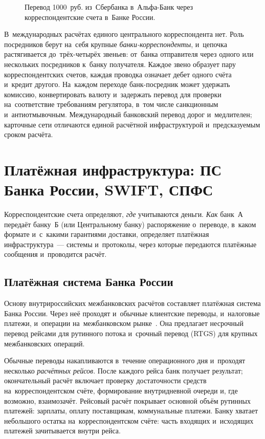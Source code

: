 \begin{figure}[tbp]
  \centering
  \caption{Перевод 1000~руб. из~Сбербанка в~Альфа-Банк через корреспондентские счета в~Банке России.}%
  \label{fig:correspondent-settlement}
\end{figure}

В~международных расчётах единого центрального корреспондента нет. Роль
посредников берут на~себя крупные \textit{банки-корреспонденты}, и~цепочка
растягивается до~трёх-четырёх звеньев: от~банка отправителя через одного или
нескольких посредников к~банку получателя. Каждое звено образует пару
корреспондентских счетов, каждая проводка означает дебет одного счёта и~кредит
другого. На~каждом переходе банк-посредник может удержать комиссию,
конвертировать валюту и~задержать перевод для проверки на~соответствие
требованиям регулятора, в~том числе санкционным и~антиотмывочным. Международный банковский перевод дорог и~медлителен;
карточные сети отличаются единой расчётной инфраструктурой и~предсказуемым
сроком расчёта.

\section{Платёжная инфраструктура: ПС Банка России, SWIFT, СПФС}\label{sec:banks-infrastructure}

Корреспондентские счета определяют, \emph{где} учитываются деньги.
\emph{Как} банк~А передаёт банку~Б (или Центральному банку) распоряжение
о~переводе, в~каком формате и~с~какими гарантиями доставки, определяет платёжная
инфраструктура~--- системы и~протоколы, через которые передаются платёжные
сообщения и~проводится расчёт.

\subsection*{Платёжная система Банка России}

Основу внутрироссийских межбанковских расчётов составляет платёжная система
Банка России. Через неё проходят и~обычные клиентские переводы, и~налоговые
платежи, и~операции на~межбанковском рынке~\cite{cbr-ps}. Она предлагает
несрочный перевод рейсами для рутинного потока и~срочный перевод (RTGS)
для крупных межбанковских операций.

Обычные переводы накапливаются в~течение операционного дня и~проходят несколько
\textit{расчётных рейсов}. После каждого рейса банк получает результат;
окончательный расчёт включает проверку достаточности средств
на~корреспондентском счёте, формирование внутридневной очереди и, где возможно,
взаимозачёт. Рейсовый расчёт покрывает основной объём рутинных платежей:
зарплаты, оплату поставщикам, коммунальные платежи. Банку хватает небольшого
остатка на~корреспондентском счёте: часть входящих и~исходящих платежей
зачитывается внутри рейса.

